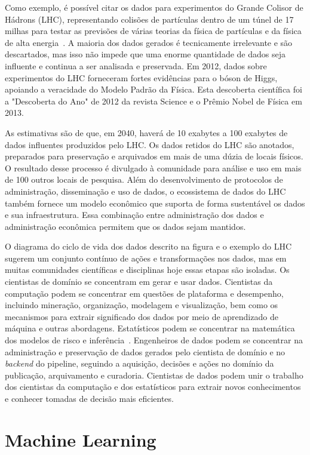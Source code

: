 \documentclass[portugues]{ic-tese}
\begin{document}
Como exemplo, é possível citar os dados para experimentos do Grande Colisor de Hádrons (LHC), representando colisões de partículas dentro de um túnel de 17 milhas para testar as previsões de várias teorias da física de partículas e da física de alta energia~\citep{Berman_2018}. A maioria dos dados gerados é tecnicamente irrelevante e são descartados, mas isso não impede que uma enorme quantidade de dados seja influente e continua a ser analisada e preservada. Em 2012, dados sobre experimentos do LHC forneceram fortes evidências para o bóson de Higgs, apoiando a veracidade do Modelo Padrão da Física. Esta descoberta científica foi a "Descoberta do Ano" de 2012 da revista Science e o Prêmio Nobel de Física em 2013.

As estimativas são de que, em 2040, haverá de 10 exabytes a 100 exabytes de dados influentes produzidos pelo LHC. Os dados retidos do LHC são anotados, preparados para preservação e arquivados em mais de uma dúzia de locais físicos. O resultado desse processo é divulgado à comunidade para análise e uso em mais de 100 outros locais de pesquisa. Além do desenvolvimento de protocolos de administração, disseminação e uso de dados, o ecossistema de dados do LHC também fornece um modelo econômico que suporta de forma sustentável os dados e sua infraestrutura. Essa combinação entre administração dos dados e administração econômica permitem que os dados sejam mantidos.

O diagrama do ciclo de vida dos dados descrito na figura e o exemplo do LHC sugerem um conjunto contínuo de ações e transformações nos dados, mas em muitas comunidades científicas e disciplinas hoje essas etapas são isoladas. Os cientistas de domínio se concentram em gerar e usar dados. Cientistas da computação podem se concentrar em questões de plataforma e desempenho, incluindo mineração, organização, modelagem e visualização, bem como os mecanismos para extrair significado dos dados por meio de aprendizado de máquina e outras abordagens. Estatísticos podem se concentrar na matemática dos modelos de risco e inferência~\citep{Berman_2018}. Engenheiros de dados podem se concentrar na administração e preservação de dados gerados pelo cientista de domínio e no \textit{backend} do pipeline, seguindo a aquisição, decisões e ações no domínio da publicação, arquivamento e curadoria. Cientistas de dados podem unir o trabalho dos cientistas da computação e dos estatísticos para extrair novos conhecimentos e conhecer tomadas de decisão mais eficientes.


\section{Machine Learning}
\end{document}
